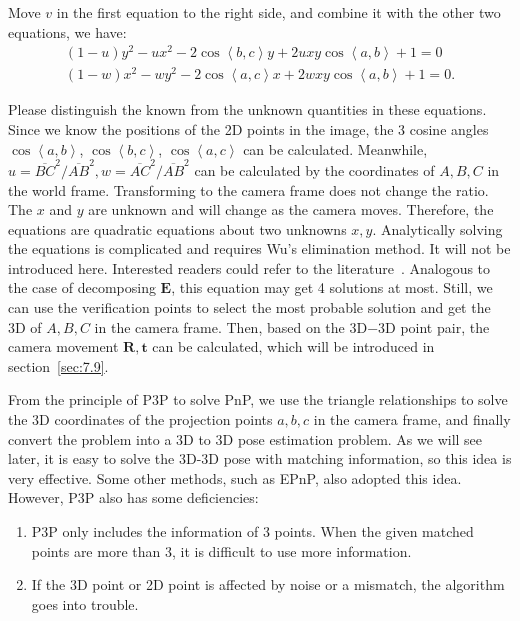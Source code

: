 Move $v$ in the first equation to the right side, and combine it with the other two equations, we have:
\begin{equation}
\begin{array}{l}
\left( {1 - u} \right){y^2} - u{x^2} - 2 \cos \left\langle b,c \right \rangle y + 2uxy\cos \left\langle a,b \right \rangle  + 1 = 0 \\
\left( {1 - w} \right){x^2} - w{y^2} - 2 \cos \left\langle a,c \right \rangle x + 2wxy\cos \left\langle a,b \right \rangle  + 1 = 0.
\end{array}
\end{equation}

Please distinguish the known from the unknown quantities in these equations. Since we know the positions of the 2D points in the image, the 3 cosine angles $\cos \left \langle a,b \right \rangle$, $\cos \left\langle b,c \right \rangle$, $\cos \left \langle a,c \right \rangle$ can be calculated. Meanwhile, $u=\overline{BC}^2/\overline{AB}^2, w=\overline{AC}^2/\overline{AB}^2$ can be calculated by the coordinates of $A, B, C$ in the world frame. Transforming to the camera frame does not change the ratio. The $x$ and $y$ are unknown and will change as the camera moves. Therefore, the equations are quadratic equations about two unknowns $x, y$. Analytically solving the equations is complicated and requires Wu's elimination method. It will not be introduced here. Interested readers could refer to the literature~\cite{GaoHouTangEtAl2003}. Analogous to the case of decomposing $\mathbf{E}$, this equation may get 4 solutions at most. Still, we can use the verification points to select the most probable solution and get the 3D of $A, B, C$ in the camera frame. Then, based on the 3D−3D point pair, the camera movement $\mathbf{R}, \mathbf{t}$ can be calculated, which will be introduced in section~\ref{sec:7.9}.

From the principle of P3P to solve PnP, we use the triangle relationships to solve the 3D coordinates of the projection points $a, b, c$ in the camera frame, and finally convert the problem into a 3D to 3D pose estimation problem. As we will see later, it is easy to solve the 3D-3D pose with matching information, so this idea is very effective. Some other methods, such as EPnP, also adopted this idea. However, P3P also has some deficiencies:

\begin{enumerate}
	\item P3P only includes the information of 3 points. When the given matched points are more than 3, it is difficult to use more information.
	\item If the 3D point or 2D point is affected by noise or a mismatch, the algorithm goes into trouble.
\end{enumerate}

